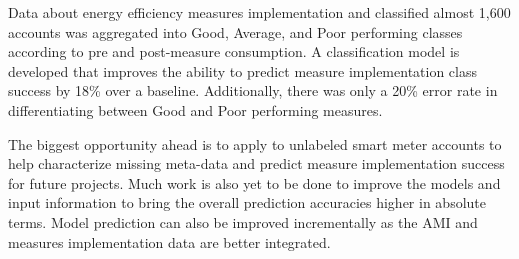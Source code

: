Data about energy efficiency measures implementation and classified almost 1,600 accounts was aggregated into Good, Average, and Poor performing classes according to pre and post-measure consumption. A classification model is developed that improves the ability to predict measure implementation class success by 18\% over a baseline. Additionally, there was only a 20\% error rate in differentiating between Good and Poor performing measures.

The biggest opportunity ahead is to apply to unlabeled smart meter accounts to help characterize missing meta-data and predict measure implementation success for future projects. Much work is also yet to be done to improve the models and input information to bring the overall prediction accuracies higher in absolute terms. Model prediction can also be improved incrementally as the AMI and measures implementation data are better integrated. 